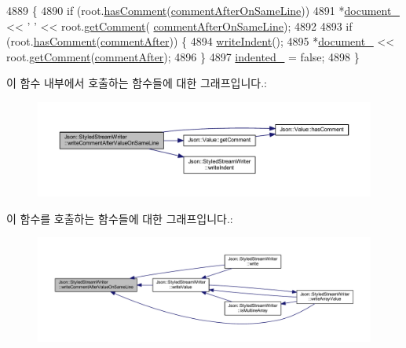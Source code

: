 \begin{DoxyCode}
4889                                                                            \{
4890   \textcolor{keywordflow}{if} (root.\hyperlink{class_json_1_1_value_a65d8e3ab6a5871cbd019a3e0f0b944a3}{hasComment}(\hyperlink{namespace_json_a4fc417c23905b2ae9e2c47d197a45351a008a230a0586de54f30b76afe70fdcfa}{commentAfterOnSameLine}))
4891     *\hyperlink{class_json_1_1_styled_stream_writer_aa8c4e4576f5c3dcb10955d133a092dd6}{document\_} << \textcolor{charliteral}{' '} << root.\hyperlink{class_json_1_1_value_a82817229a986f0b254e31d5c83066ffe}{getComment}(
      \hyperlink{namespace_json_a4fc417c23905b2ae9e2c47d197a45351a008a230a0586de54f30b76afe70fdcfa}{commentAfterOnSameLine});
4892 
4893   \textcolor{keywordflow}{if} (root.\hyperlink{class_json_1_1_value_a65d8e3ab6a5871cbd019a3e0f0b944a3}{hasComment}(\hyperlink{namespace_json_a4fc417c23905b2ae9e2c47d197a45351ac5784ca53b12250888ddb642b06aebef}{commentAfter})) \{
4894     \hyperlink{class_json_1_1_styled_stream_writer_a5a52fa5b406f1580a61dde3b5638e76d}{writeIndent}();
4895     *\hyperlink{class_json_1_1_styled_stream_writer_aa8c4e4576f5c3dcb10955d133a092dd6}{document\_} << root.\hyperlink{class_json_1_1_value_a82817229a986f0b254e31d5c83066ffe}{getComment}(\hyperlink{namespace_json_a4fc417c23905b2ae9e2c47d197a45351ac5784ca53b12250888ddb642b06aebef}{commentAfter});
4896   \}
4897   \hyperlink{class_json_1_1_styled_stream_writer_aa12db1753619a9b48da41f3e45e3275d}{indented\_} = \textcolor{keyword}{false};
4898 \}
\end{DoxyCode}
이 함수 내부에서 호출하는 함수들에 대한 그래프입니다.\+:\nopagebreak
\begin{figure}[H]
\begin{center}
\leavevmode
\includegraphics[width=350pt]{class_json_1_1_styled_stream_writer_ad2ca860e317ca91d6b2932535b4ce9c7_cgraph}
\end{center}
\end{figure}
이 함수를 호출하는 함수들에 대한 그래프입니다.\+:\nopagebreak
\begin{figure}[H]
\begin{center}
\leavevmode
\includegraphics[width=350pt]{class_json_1_1_styled_stream_writer_ad2ca860e317ca91d6b2932535b4ce9c7_icgraph}
\end{center}
\end{figure}
